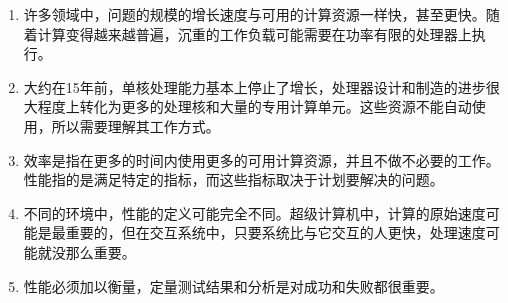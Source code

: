\begin{enumerate}
\item 
许多领域中，问题的规模的增长速度与可用的计算资源一样快，甚至更快。随着计算变得越来越普遍，沉重的工作负载可能需要在功率有限的处理器上执行。

\item 
大约在15年前，单核处理能力基本上停止了增长，处理器设计和制造的进步很大程度上转化为更多的处理核和大量的专用计算单元。这些资源不能自动使用，所以需要理解其工作方式。

\item 
效率是指在更多的时间内使用更多的可用计算资源，并且不做不必要的工作。性能指的是满足特定的指标，而这些指标取决于计划要解决的问题。

\item
不同的环境中，性能的定义可能完全不同。超级计算机中，计算的原始速度可能是最重要的，但在交互系统中，只要系统比与它交互的人更快，处理速度可能就没那么重要。

\item
性能必须加以衡量，定量测试结果和分析是对成功和失败都很重要。
	
\end{enumerate}
